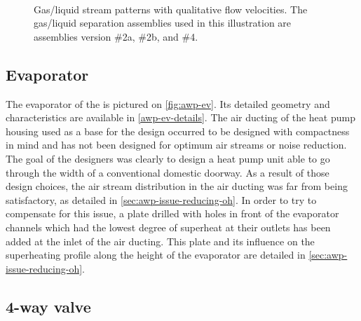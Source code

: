 \begin{figure}[htbp]
  \centering {}
  \hspace{1em} 
  \\
  \hspace{1em} 
  \hspace{1em} 
  \caption[Gas/liquid stream patterns with qualitative flow
  velocities]{Gas/liquid stream patterns with qualitative flow
    velocities. The gas/liquid separation assemblies used in this
    illustration are assemblies version \#2a, \#2b, and \#4.}
  \label{fig:awp-eco-flow-rates}
\end{figure}

\subsection{Evaporator}
\label{sec:awp-ev}

The evaporator of the \AWP{} is pictured on \cref{fig:awp-ev}. Its
detailed geometry and characteristics are available in
\cref{awp-ev-details}. The air ducting of the heat pump housing used
as a base for the \AWP{} design occurred to be designed with
compactness in mind and has not been designed for optimum air streams
or noise reduction. The goal of the designers was clearly to design a
heat pump unit able to go through the width of a conventional domestic
doorway. As a result of those design choices, the air stream
distribution in the air ducting was far from being satisfactory, as
detailed in \cref{sec:awp-issue-reducing-oh}. In order to try to
compensate for this issue, a plate drilled with holes in front of the
evaporator channels which had the lowest degree of superheat at their
outlets has been added at the inlet of the air ducting. This plate and
its influence on the superheating profile along the height of the
evaporator are detailed in \cref{sec:awp-issue-reducing-oh}.

\subsection{4-way valve}
\label{sec:awp-4way}

